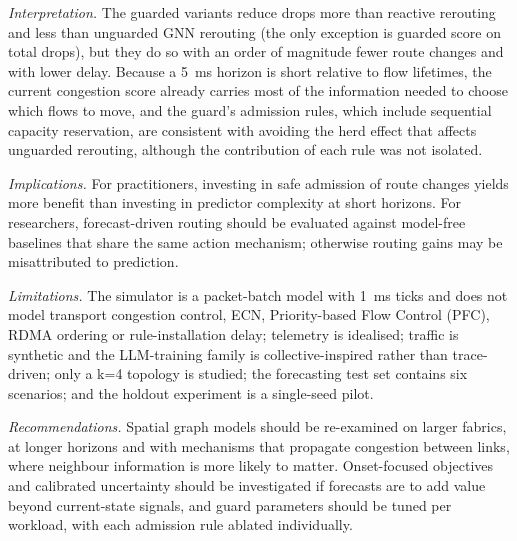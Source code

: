 \documentclass[conference]{IEEEtran}
\begin{document}
\emph{Interpretation.} The guarded variants reduce drops more than reactive rerouting and less than unguarded GNN rerouting (the only exception is guarded score on total drops), but they do so with an order of magnitude fewer route changes and with lower delay. Because a 5~ms horizon is short relative to flow lifetimes, the current congestion score already carries most of the information needed to choose which flows to move, and the guard's admission rules, which include sequential capacity reservation, are consistent with avoiding the herd effect that affects unguarded rerouting, although the contribution of each rule was not isolated.

\emph{Implications.} For practitioners, investing in safe admission of route changes yields more benefit than investing in predictor complexity at short horizons. For researchers, forecast-driven routing should be evaluated against model-free baselines that share the same action mechanism; otherwise routing gains may be misattributed to prediction.

\emph{Limitations.} The simulator is a packet-batch model with 1~ms ticks and does not model transport congestion control, ECN, Priority-based Flow Control (PFC), RDMA ordering or rule-installation delay; telemetry is idealised; traffic is synthetic and the LLM-training family is collective-inspired rather than trace-driven; only a k=4 topology is studied; the forecasting test set contains six scenarios; and the holdout experiment is a single-seed pilot.

\emph{Recommendations.} Spatial graph models should be re-examined on larger fabrics, at longer horizons and with mechanisms that propagate congestion between links, where neighbour information is more likely to matter. Onset-focused objectives and calibrated uncertainty should be investigated if forecasts are to add value beyond current-state signals, and guard parameters should be tuned per workload, with each admission rule ablated individually.

\end{document}

